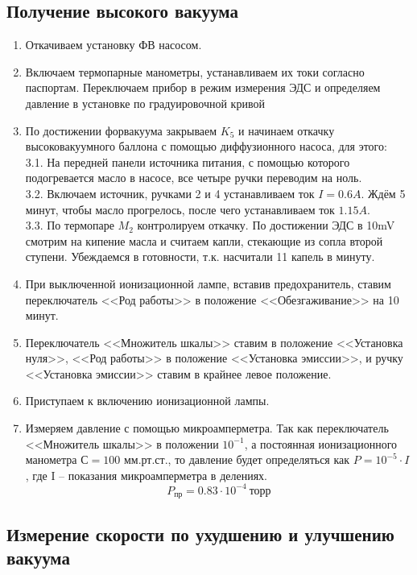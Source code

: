 \documentclass[a4paper,12pt]{article} %
\begin{document}
 \subsection*{Получение высокого вакуума}
	\begin{enumerate}
	\item Откачиваем установку ФВ насосом.
	\item Включаем термопарные манометры, устанавливаем их токи согласно паспортам. Переключаем прибор в режим измерения ЭДС и определяем давление в установке по градуировочной кривой
	\item По достижении форвакуума закрываем $K_5$ и начинаем откачку высоковакуумного баллона с помощью диффузионного насоса, для этого:\\
	3.1. На передней панели источника питания, с помощью которого подогревается масло в насосе, все четыре ручки переводим на ноль.\\
	3.2. Включаем источник, ручками 2 и 4 устанавливаем ток $I = 0.6A$. Ждём 5 минут, чтобы масло прогрелось, после чего устанавливаем ток $1.15A$. \\
	3.3. По термопаре $M_2$ контролируем откачку. По достижении ЭДС в 10mV смотрим на кипение масла и считаем капли, стекающие из сопла второй ступени. Убеждаемся в готовности, т.к. насчитали 11 капель в минуту.
	\item При выключенной ионизационной лампе, вставив предохранитель, ставим переключатель <<Род работы>> в положение <<Обезгаживание>> на 10 минут.
	\item Переключатель <<Множитель шкалы>> ставим в положение <<Установка нуля>>, <<Род работы>> в положение <<Установка эмиссии>>, и ручку <<Установка эмиссии>> ставим в крайнее левое положение.
	\item Приступаем к включению ионизационной лампы.
	\item Измеряем давление с помощью микроамперметра. Так как переключатель <<Множитель шкалы>> в положении $10^{-1}$, а постоянная ионизационного манометра $С = 100$ мм.рт.ст., то давление будет определяться как $P = 10^{-5}\cdot I$, где I -- показания микроамперметра в делениях. \\
	$$P_{\text{пр}} = 0.83\cdot10^{-4} ~\text{торр}$$
\end{enumerate}

\subsection*{Измерение скорости по ухудшению и улучшению вакуума}
\end{document}
